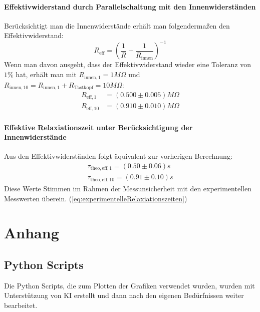 \documentclass{report}
\begin{document}
\subsubsection{Effektivwiderstand durch Parallelschaltung mit den Innenwiderständen}
Berücksichtigt man die Innenwiderstände erhält man folgendermaßen den Effektivwiderstand:
\begin{equation}
    R_{\mathrm{eff}} = \left(\frac{1}{R} + \frac{1}{R_{\mathrm{innen}}}\right)^{-1}
\end{equation}
Wenn man davon ausgeht, dass der Effektivwiderstand wieder eine Toleranz von $1\%$ hat, erhält man mit $R_{\mathrm{innen, 1}} = 1 \si{M \Omega}$
und $R_{\mathrm{innen, 10}} = R_{\mathrm{innen, 1}} + R_{\mathrm{Tastkopf}} = 10 \si{M \Omega}$:
\begin{equation}
    \begin{split}
        R_{\mathrm{eff, 1}} &= (0.500 \pm 0.005) \si{M \Omega} \\
        R_{\mathrm{eff, 10}} &= (0.910 \pm 0.010) \si{M \Omega}
    \end{split}
\end{equation}
\subsubsection{Effektive Relaxiationszeit unter Berücksichtigung der Innenwiderstände}
Aus den Effektivwiderständen folgt äquivalent zur vorherigen Berechnung:
\begin{equation}
    \begin{split}
        \boxed{\tau_{\mathrm{theo, eff, 1}}  =  (0.50 \pm 0.06)s} \\
        \boxed{\tau_{\mathrm{theo, eff, 10}} = (0.91 \pm 0.10) s}
    \end{split}
\end{equation}
Diese Werte Stimmen im Rahmen der Messunsicherheit mit den experimentellen Messwerten überein. (\ref{eq:experimentelleRelaxiationszeiten})
\newpage
\chapter{Anhang}
\section{Python Scripts}
Die Python Scripts, die zum Plotten der Grafiken verwendet wurden, wurden mit Unterstützung von KI erstellt und dann nach den eigenen Bedürfnissen weiter
bearbeitet.
\end{document}
